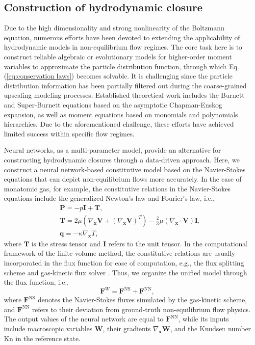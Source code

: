 \documentclass[preprint,3p,12pt,sort&compress]{elsarticle}
\begin{document}
\subsection{Construction of hydrodynamic closure}

Due to the high dimensionality and strong nonlinearity of the Boltzmann equation, numerous efforts have been devoted to extending the applicability of hydrodynamic models in non-equilibrium flow regimes.
The core task here is to construct reliable algebraic or evolutionary models for higher-order moment variables to approximate the particle distribution function, through which Eq.(\ref{eq:conservation laws}) becomes solvable.
It is challenging since the particle distribution information has been partially filtered out during the coarse-grained upscaling modeling processes.
Established theoretical work includes the Burnett and Super-Burnett equations based on the asymptotic Chapman-Enskog expansion, as well as moment equations based on monomials and polynomials hierarchies.
Due to the aforementioned challenge, these efforts have achieved limited success within specific flow regimes.

Neural networks, as a multi-parameter model, provide an alternative for constructing hydrodynamic closures through a data-driven approach.
Here, we construct a neural network-based constitutive model based on the Navier-Stokes equations that can depict non-equilibrium flows more accurately.
In the case of monatomic gas, for example, the constitutive relations in the Navier-Stokes equations include the generalized Newton's law and Fourier's law, i.e.,
\begin{equation}
\begin{aligned}
    &\mathbf P=-p \mathbf I + \mathbf T, \\
    &\mathbf T=2\mu (\nabla_{\mathbf x} \mathbf V+(\nabla_{\mathbf x} \mathbf V)^T)-\frac{2}{3}\mu (\nabla_{\mathbf x} \cdot \mathbf V) \mathbf I, \\
    &\mathbf q = -\kappa \nabla_{\mathbf x} T,
\end{aligned}
\end{equation}
where $\mathbf T$ is the stress tensor and $\mathbf I$ refers to the unit tensor.
In the computational framework of the finite volume method, the constitutive relations are usually incorporated in the flux function for ease of computation, e.g., the flux splitting scheme \cite{wada1997accurate} and gas-kinetic flux solver \cite{xu2001gas}.
Thus, we organize the unified model through the flux function, i.e.,
\begin{equation}
    \mathbf F^W=\mathbf F^\mathrm{NS}+\mathbf F^\mathrm{NN},
\end{equation}
where $\mathbf F^\mathrm{NS}$ denotes the Navier-Stokes fluxes simulated by the gas-kinetic scheme, and $\mathbf F^\mathrm{NN}$ refers to their deviation from ground-truth non-equilibrium flow physics.
The output values of the neural network are equal to $\mathbf F^\mathrm{NN}$, while its inputs include macroscopic variables $\mathbf W$, their gradients $\nabla_{\mathbf x} \mathbf W$, and the Knudsen number $\mathrm{Kn}$ in the reference state.
\end{document}
